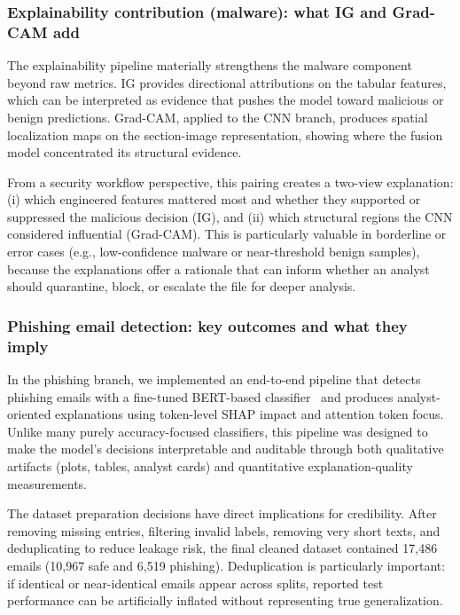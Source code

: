 \documentclass[conference]{IEEEtran}
\begin{document}
\subsubsection{Explainability contribution (malware): what IG and Grad-CAM add}

The explainability pipeline materially strengthens the malware component beyond raw metrics. IG provides directional attributions on the tabular features, which can be interpreted as evidence that pushes the model toward malicious or benign predictions. Grad-CAM, applied to the CNN branch, produces spatial localization maps on the section-image representation, showing where the fusion model concentrated its structural evidence.

From a security workflow perspective, this pairing creates a two-view explanation: (i) which engineered features mattered most and whether they supported or suppressed the malicious decision (IG), and (ii) which structural regions the CNN considered influential (Grad-CAM). This is particularly valuable in borderline or error cases (e.g., low-confidence malware or near-threshold benign samples), because the explanations offer a rationale that can inform whether an analyst should quarantine, block, or escalate the file for deeper analysis.

\subsubsection{Phishing email detection: key outcomes and what they imply}

In the phishing branch, we implemented an end-to-end pipeline that detects phishing emails with a fine-tuned BERT-based classifier~\cite{KBSSSK2025} and produces analyst-oriented explanations using token-level SHAP impact and attention token focus. Unlike many purely accuracy-focused classifiers, this pipeline was designed to make the model’s decisions interpretable and auditable through both qualitative artifacts (plots, tables, analyst cards) and quantitative explanation-quality measurements.

The dataset preparation decisions have direct implications for credibility. After removing missing entries, filtering invalid labels, removing very short texts, and deduplicating to reduce leakage risk, the final cleaned dataset contained 17,486 emails (10,967 safe and 6,519 phishing). Deduplication is particularly important: if identical or near-identical emails appear across splits, reported test performance can be artificially inflated without representing true generalization.
\end{document}
